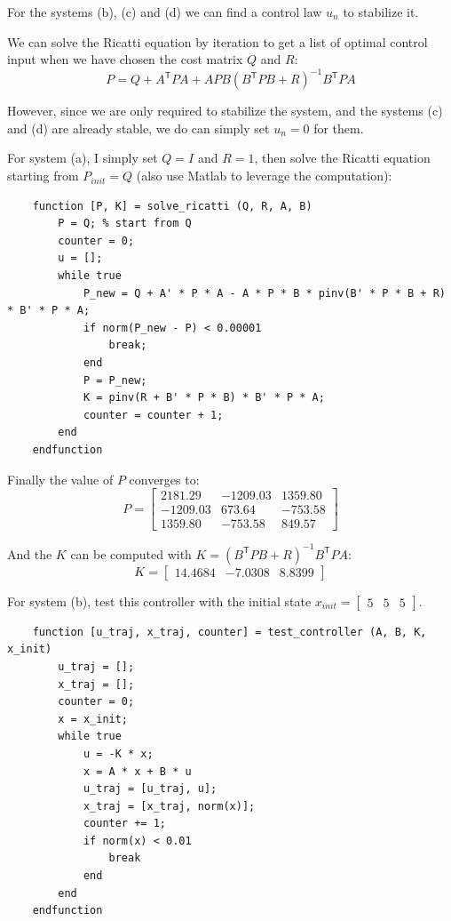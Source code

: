 For the systems (b), (c) and (d) we can find a control law \( u_n \) to stabilize it.

We can solve the Ricatti equation by iteration to get a list of optimal control input when we have chosen the cost matrix \( Q \) and \( R \):
\[
    P = Q + A^\mathsf{T} P A + A P B {(B^\mathsf{T} P B + R)}^{-1} B^\mathsf{T} P A
\]

However, since we are only required to stabilize the system, and the systems (c) and (d) are already stable, we do can simply set \( u_n = 0 \) for them.

For system (a), I simply set \( Q = I \) and \( R = 1 \), then solve the Ricatti equation starting from \( P_{init} = Q \) (also use Matlab to leverage the computation):

\begin{verbatim}
    function [P, K] = solve_ricatti (Q, R, A, B)
        P = Q; % start from Q
        counter = 0;
        u = [];
        while true
            P_new = Q + A' * P * A - A * P * B * pinv(B' * P * B + R) * B' * P * A;
            if norm(P_new - P) < 0.00001
                break;
            end
            P = P_new;
            K = pinv(R + B' * P * B) * B' * P * A;
            counter = counter + 1;
        end
    endfunction
\end{verbatim}

Finally the value of \( P \) converges to:
\[
    P =
    \begin{bmatrix}
        2181.29 & -1209.03 & 1359.80 \\
        -1209.03 & 673.64 & -753.58 \\
        1359.80 & -753.58 & 849.57
    \end{bmatrix}
\]

And the \( K \) can be computed with \( K = {(B^\mathsf{T} P B + R)}^{-1} B^\mathsf{T} P A \):
\[
    K =
    \begin{bmatrix}
        14.4684 & -7.0308 & 8.8399
    \end{bmatrix}
\]

For system (b), test this controller with the initial state
\( x_{init} = \begin{bmatrix}
    5 & 5 & 5
\end{bmatrix} \).

\begin{verbatim}
    function [u_traj, x_traj, counter] = test_controller (A, B, K, x_init)
        u_traj = [];
        x_traj = [];
        counter = 0;
        x = x_init;
        while true
            u = -K * x;
            x = A * x + B * u
            u_traj = [u_traj, u];
            x_traj = [x_traj, norm(x)];
            counter += 1;
            if norm(x) < 0.01
                break
            end
        end
    endfunction
\end{verbatim}

